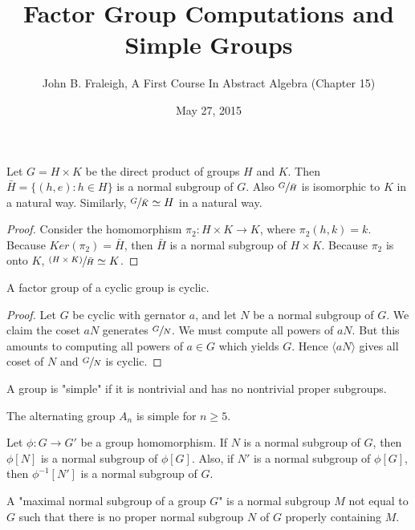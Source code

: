\documentclass[a4paper,11pt]{article}
\title{Factor Group Computations and Simple Groups}
\author{John B. Fraleigh, A First Course In Abstract Algebra (Chapter 15)}
\date{May 27, 2015}
\begin{document}
\maketitle
{}

\begin{outline}

    Let \(G = H \times K\) be the direct product of groups \(H\) and \(K\). Then \(\bar{H} = \{(h, e) : h \in H\}\) 
    is a normal subgroup of \(G\). Also \(\sfrac{G}{\bar{H}}\) is isomorphic to \(K\) in a natural way. Similarly, 
    \(\sfrac{G}{\bar{K}} \simeq H\) in a natural way.
    
    \begin{proof}
      Consider the homomorphism \(\pi_{2}: H \times K \rightarrow K\), where \(\pi_{2}(h, k) = k\). Because
      \(Ker(\pi_{2}) = \bar{H}\), then \(\bar{H}\) is a normal subgroup of \(H \times K\). Because 
      \(\pi_{2}\) is onto \(K\), \(\sfrac{(H \times K)}{\bar{H}} \simeq K\).
    \end{proof}

    A factor group of a cyclic group is cyclic.
    
    \begin{proof}
      Let \(G\) be cyclic with gernator \(a\), and let \(N\) be a normal subgroup of \(G\). We claim the coset \(aN\)
      generates \(\sfrac{G}{N}\). We must compute all powers of \(aN\). But this amounts to computing all powers of 
      \(a \in G\) which yields \(G\). Hence \(\langle aN \rangle\) gives all coset of \(N\) and \(\sfrac{G}{N}\) is cyclic.
    \end{proof}
    
    A group is "simple" if it is nontrivial and has no nontrivial proper subgroups.
    
    The alternating group \(A_{n}\) is simple for \(n \geq 5\).
    
    Let \(\phi: G \rightarrow G'\) be a group homomorphism. If \(N\) is a normal subgroup of \(G\), then 
    \(\phi[N]\) is a normal subgroup of \(\phi[G]\). Also, if \(N'\) is a normal subgroup of \(\phi[G]\),
    then \(\phi^{-1}[N']\) is a normal subgroup of \(G\).
    
    A "maximal normal subgroup of a group \(G\)" is a normal subgroup \(M\) not equal to \(G\) such that 
    there is no proper normal subgroup \(N\) of \(G\) properly containing \(M\).
    

\end{outline}
\end{document}
